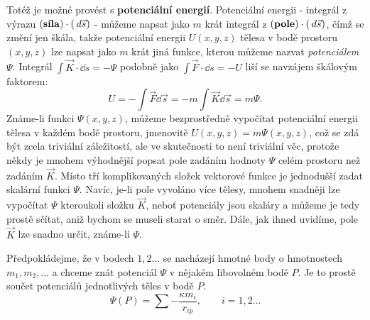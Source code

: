     Totéž je možné provést s \textbf{potenciální energií}. Potenciální energii - integrál z výrazu 
    \((\text{\textbf{síla}})\cdot(\hspace{2pt}d\vec{s})\) - můžeme napsat jako \(m\) krát integrál z 
    \((\text{\textbf{pole}})\cdot(\hspace{2pt}d\vec{s})\), čímž se změní jen škála, takže potenciální 
    energii \(U(x, y, z)\) tělesa v bodě prostoru \((x, y, z)\) lze napsat jako \(m\) krát jiná 
    funkce, kterou můžeme nazvat \emph{potenciálem} \(\Psi\). Integrál \(\int\vec{K}\cdot\dd{s}= 
    -\Psi\) podobně jako \(\int\vec{F}\cdot\dd{s}= -U\) liší se navzájem škálovým faktorem:
    \begin{equation}\label{FYZ:eq002}
      U = -\int\vec{F}\dd{\vec{s}} = -m\int\vec{K}\dd{\vec{s}} = m\Psi.
    \end{equation}
    Známe-li funkci \(\Psi(x, y, z)\), můžeme bezprostředně vypočítat potenciální energii tělesa v 
    každém bodě prostoru, jmenovitě \(U(x, y, z) = m\Psi(x, y, z)\), což se zdá být zcela triviální 
    záležitostí, ale ve skutečnosti to není triviální věc, protože někdy je mnohem výhodnější 
    popsat pole zadáním hodnoty \(\Psi\) celém prostoru než zadáním \(\vec{K}\). Místo tří 
    komplikovaných složek vektorové funkce je jednodušší zadat skalární funkci \(\Psi\). Navíc, 
    je-li pole vyvoláno více tělesy, mnohem snadněji lze vypočítat \(\Psi\) kteroukoli složku 
    \(\vec{K}\), neboť potenciály jsou skaláry a můžeme je tedy prostě sčítat, aniž bychom se 
    museli starat o směr. Dále, jak ihned uvidíme, pole \(\vec{K}\) lze snadno určit, známe-li 
    \(\Psi\).
    
    Předpokládejme, že v bodech \(1, 2 \ldots\) se nacházejí hmotné body o hmotnostech \(m_1, m_2, 
    \ldots\) a chceme znát potenciál \(\Psi\) v nějakém libovolném bodě \(P\). Je to prostě součet 
    potenciálů jednotlivých těles v bodě \(P\).
    \begin{equation}\label{FYZ:eq003}
      \Psi(P) = \sum-\frac{\kappa m_i}{r_{ip}}, \qquad i = 1, 2 \ldots
    \end{equation}
    
